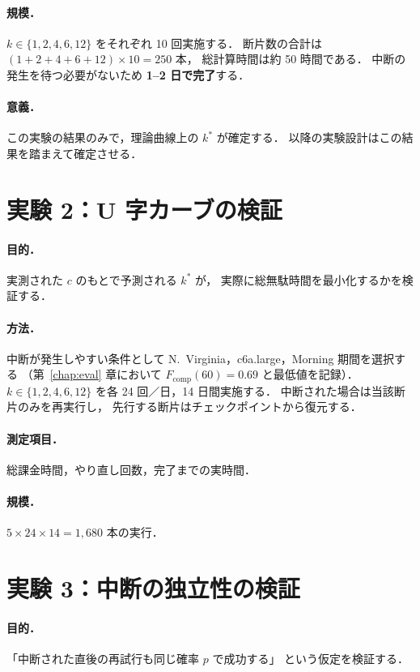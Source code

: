 \documentclass[11pt,a4paper]{ltjsreport}
\newcommand{\Fcomp}{F_{\mathrm{comp}}}
\begin{document}
\paragraph{規模．}
$k \in \{1,2,4,6,12\}$ をそれぞれ 10 回実施する．
断片数の合計は $(1+2+4+6+12)\times 10 = 250$ 本，
総計算時間は約 50 時間である．
中断の発生を待つ必要がないため \textbf{1--2 日で完了}する．

\paragraph{意義．}
この実験の結果のみで，理論曲線上の $k^{*}$ が確定する．
以降の実験設計はこの結果を踏まえて確定させる．

\section{実験 2：U 字カーブの検証}

\paragraph{目的．}
実測された $c$ のもとで予測される $k^{*}$ が，
実際に総無駄時間を最小化するかを検証する．

\paragraph{方法．}
中断が発生しやすい条件として
N.~Virginia，c6a.large，Morning 期間を選択する
（第~\ref{chap:eval} 章において $\Fcomp(60) = 0.69$ と最低値を記録）．
$k \in \{1,2,4,6,12\}$ を各 24 回／日，14 日間実施する．
中断された場合は当該断片のみを再実行し，
先行する断片はチェックポイントから復元する．

\paragraph{測定項目．}
総課金時間，やり直し回数，完了までの実時間．

\paragraph{規模．}
$5 \times 24 \times 14 = 1{,}680$ 本の実行．

\section{実験 3：中断の独立性の検証}

\paragraph{目的．}
「中断された直後の再試行も同じ確率 $p$ で成功する」
という仮定を検証する．
\end{document}

